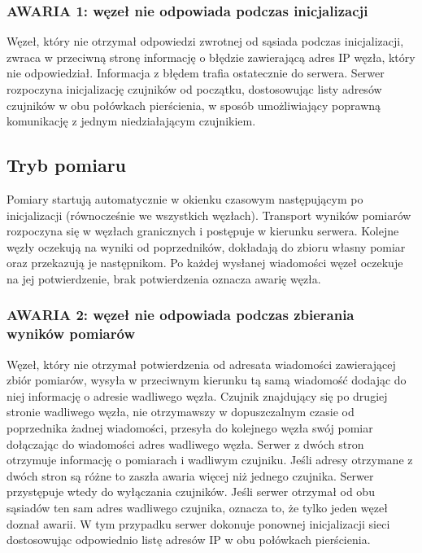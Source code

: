 \documentclass[a4paper,11pt]{article}
\begin{document}
\subsubsection{AWARIA 1: węzeł nie odpowiada podczas inicjalizacji}
Węzeł, który nie otrzymał odpowiedzi zwrotnej od sąsiada podczas inicjalizacji, zwraca w przeciwną stronę informację o błędzie zawierającą adres IP węzła, który nie odpowiedział. Informacja z błędem trafia ostatecznie do serwera. Serwer rozpoczyna inicjalizację czujników od początku, dostosowując listy adresów czujników w obu połówkach pierścienia, w sposób umożliwiający poprawną komunikację z jednym niedziałającym czujnikiem. 

\subsection{Tryb pomiaru}
Pomiary startują automatycznie w okienku czasowym następującym po inicjalizacji (równocześnie we wszystkich węzłach). Transport wyników pomiarów rozpoczyna się w węzłach granicznych i postępuje w kierunku serwera. Kolejne węzły oczekują na wyniki od poprzedników, dokładają do zbioru własny pomiar oraz przekazują je następnikom. Po każdej wysłanej wiadomości węzeł oczekuje na jej potwierdzenie, brak potwierdzenia oznacza awarię węzła.

\subsubsection{AWARIA 2: węzeł nie odpowiada podczas zbierania wyników pomiarów}
Węzeł, który nie otrzymał potwierdzenia od adresata wiadomości zawierającej zbiór pomiarów, wysyła w przeciwnym kierunku tą samą wiadomość dodając do niej informację o adresie wadliwego węzła. Czujnik znajdujący się po drugiej stronie wadliwego węzła, nie otrzymawszy w dopuszczalnym czasie od poprzednika żadnej wiadomości, przesyła do kolejnego węzła swój pomiar dołączając do wiadomości adres wadliwego węzła. Serwer z dwóch stron otrzymuje informację o pomiarach i wadliwym czujniku. Jeśli adresy otrzymane z dwóch stron są różne to zaszła awaria więcej niż jednego czujnika. Serwer przystępuje wtedy do wyłączania czujników. Jeśli serwer otrzymał od obu sąsiadów ten sam adres wadliwego czujnika, oznacza to, że tylko jeden węzeł doznał awarii. W tym przypadku serwer dokonuje ponownej inicjalizacji sieci dostosowując odpowiednio listę adresów IP w obu połówkach pierścienia.
\end{document}
